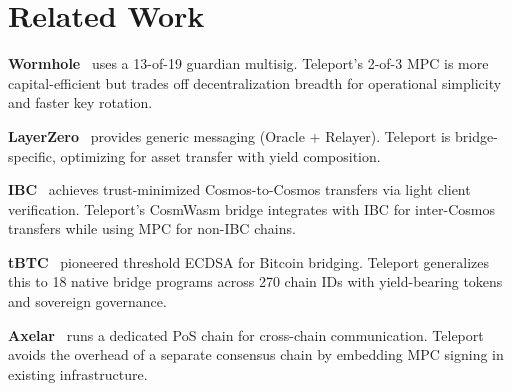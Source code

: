 \section{Related Work}

\label{sec:related}

\textbf{Wormhole}~\cite{wormhole} uses a 13-of-19 guardian multisig. Teleport's 2-of-3 MPC is more capital-efficient but trades off decentralization breadth for operational simplicity and faster key rotation.

\textbf{LayerZero}~\cite{layerzero} provides generic messaging (Oracle + Relayer). Teleport is bridge-specific, optimizing for asset transfer with yield composition.

\textbf{IBC}~\cite{ibc} achieves trust-minimized Cosmos-to-Cosmos transfers via light client verification. Teleport's CosmWasm bridge integrates with IBC for inter-Cosmos transfers while using MPC for non-IBC chains.

\textbf{tBTC}~\cite{tbtc} pioneered threshold ECDSA for Bitcoin bridging. Teleport generalizes this to 18 native bridge programs across 270 chain IDs with yield-bearing tokens and sovereign governance.

\textbf{Axelar}~\cite{axelar} runs a dedicated PoS chain for cross-chain communication. Teleport avoids the overhead of a separate consensus chain by embedding MPC signing in existing infrastructure.

